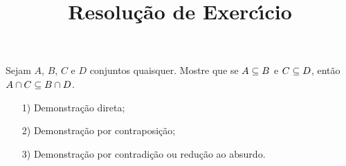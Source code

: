 \documentclass{beamer}
\title{Resolu\c{c}\~ao de Exerc{\'\i}cio}
\author[\autor]{\autor}
\institute[\instituto]{\instituto}
\date{}
\begin{document}
    \begin{frame}
        \maketitle
    \end{frame}


    \begin{frame}
        \begin{exercicio}
            Sejam $A$, $B$, $C$ e $D$ conjuntos quaisquer. Mostre que se $A \subseteq B$ e $C \subseteq D$, ent\~ao $A \cap C \subseteq B \cap D$.\pause
        \end{exercicio}
        \vspace{1cm}
        \begin{itemize}
            \item[1)] Demonstra\c{c}\~ao direta;\pause \vspace{1cm}
            \item[2)] Demonstra\c{c}\~ao por contraposi\c{c}\~ao;\pause \vspace{1cm}
            \item[3)] Demonstra\c{c}\~ao por contradi\c{c}\~ao ou redu\c{c}\~ao ao absurdo.\pause \vspace{1cm}
        \end{itemize}
    \end{frame}

    \begin{frame}
        \begin{solucao}
            \vspace{7cm}
        \end{solucao}
    \end{frame}
    \begin{frame}
        \begin{solucao}
            \vspace{7cm}
        \end{solucao}
    \end{frame}
    \begin{frame}
        \begin{solucao}
            \vspace{7cm}
        \end{solucao}
    \end{frame}
\end{document}
